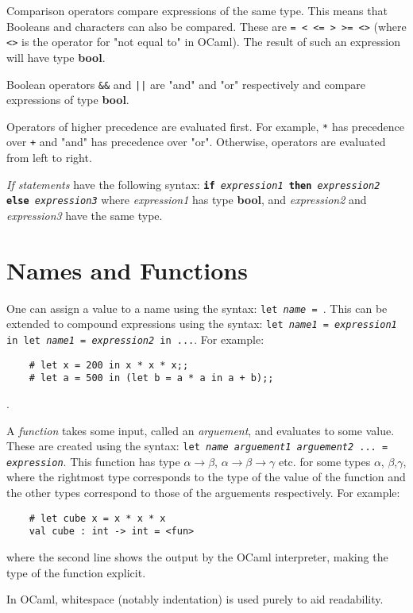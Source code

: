 \documentclass[12pt]{article}
\begin{document}
Comparison operators compare expressions of the same type. This means that Booleans and characters can
also be compared. These are \texttt{= < <= > >= <>} (where \texttt{<>}
is the operator for "not equal to" in OCaml). The result of such an expression will have type \textbf{bool}.

Boolean operators \texttt{\&\&} and \texttt{||} are "and" and "or" respectively and compare expressions
of type \textbf{bool}.

Operators of higher precedence are evaluated first. For example, \texttt{*} has precedence over \texttt{+}
and "and" has precedence over "or". Otherwise, operators are evaluated from left to right.

\textit{If statements} have the following syntax: \texttt{\textbf{if} \textit{expression1} \textbf{then}
\textit{expression2} \textbf{else} \textit{expression3}} where \textit{expression1} has type \textbf{bool}, and
\textit{expression2} and \textit{expression3} have the same type.

\section{Names and Functions}
One can assign a value to a name using the syntax: \texttt{let \textit{name} = }. This can
be extended to compound expressions using the syntax: \texttt{let \textit{name1} = \textit{expression1} in let \textit{name1}
= \textit{expression2} in ...}. For example:
\begin{lstlisting}
    # let x = 200 in x * x * x;;
    # let a = 500 in (let b = a * a in a + b);;
\end{lstlisting}.

A \textit{function} takes some input, called an \textit{arguement}, and evaluates to some value. These are
created using the syntax: \texttt{let \textit{name arguement1 arguement2} ... = \textit{expression}}.
This function has type $\alpha \rightarrow \beta$, $\alpha \rightarrow \beta \rightarrow \gamma$ etc. for
some types $\alpha$, $\beta$,$\gamma$, where the rightmost type corresponds to the type of the value of
the function and the other types correspond to those of the arguements respectively. For example:
\begin{lstlisting}
    # let cube x = x * x * x
    val cube : int -> int = <fun>
\end{lstlisting}
where the second line shows the output by the OCaml interpreter, making the type of the function explicit.

In OCaml, whitespace (notably indentation) is used purely to aid readability.
\end{document}
